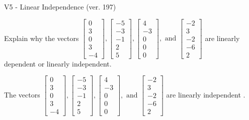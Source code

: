 \begin{exercise}
  \begin{exerciseTitle}V5 - Linear Independence (ver. 197)\end{exerciseTitle}
  \begin{exerciseStatement}
    Explain why the vectors \(\left[\begin{array}{r}
0 \\
3 \\
0 \\
3 \\
-4
\end{array}\right] , \left[\begin{array}{r}
-5 \\
-3 \\
-1 \\
2 \\
5
\end{array}\right] , \left[\begin{array}{r}
4 \\
-3 \\
0 \\
0 \\
0
\end{array}\right] , \text{ and } \left[\begin{array}{r}
-2 \\
3 \\
-2 \\
-6 \\
2
\end{array}\right]\) are linearly dependent or linearly independent.	


  \end{exerciseStatement}
  \begin{exerciseAnswer}
   The vectors \(\left[\begin{array}{r}
0 \\
3 \\
0 \\
3 \\
-4
\end{array}\right] , \left[\begin{array}{r}
-5 \\
-3 \\
-1 \\
2 \\
5
\end{array}\right] , \left[\begin{array}{r}
4 \\
-3 \\
0 \\
0 \\
0
\end{array}\right] , \text{ and } \left[\begin{array}{r}
-2 \\
3 \\
-2 \\
-6 \\
2
\end{array}\right]\) are 
  	 linearly independent  .
  


  \end{exerciseAnswer}
\end{exercise}